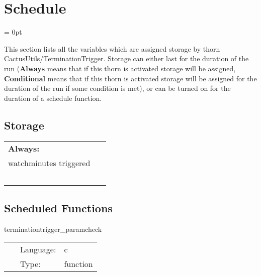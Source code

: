 
\section{Schedule} 


\parskip = 0pt


\noindent This section lists all the variables which are assigned storage by thorn CactusUtils/TerminationTrigger.  Storage can either last for the duration of the run ({\bf Always} means that if this thorn is activated storage will be assigned, {\bf Conditional} means that if this thorn is activated storage will be assigned for the duration of the run if some condition is met), or can be turned on for the duration of a schedule function.


\subsection*{Storage}

\hspace{5mm}

 \begin{tabular*}{160mm}{ll} 

{\bf Always:}&  ~ \\ 
 watchminutes triggered & ~\\ 
~ & ~\\ 
\end{tabular*} 


\subsection*{Scheduled Functions}
\vspace{5mm}


\hspace{5mm} terminationtrigger\_paramcheck 

\hspace{5mm}{\it check consitency of parameters } 


\hspace{5mm}

 \begin{tabular*}{160mm}{cll} 
~ & Language:  & c \\ 
~ & Type:  & function \\ 
\end{tabular*} 


\vspace{5mm}


